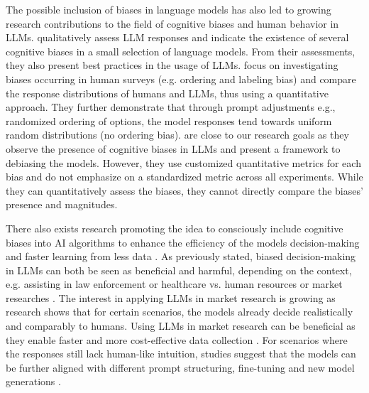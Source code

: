 \par The possible inclusion of biases in language models has also led to growing research contributions to the field of cognitive biases and human behavior in LLMs. \textcite{talboy2023challenging} qualitatively assess LLM responses and indicate the existence of several cognitive biases in a small selection of language models. From their assessments, they also present best practices in the usage of LLMs. \textcite{dominguez2023questioning} focus on investigating biases occurring in human surveys (e.g. ordering and labeling bias) and compare the response distributions of humans and LLMs, thus using a quantitative approach. They further demonstrate that through prompt adjustments e.g., randomized ordering of options, the model responses tend towards uniform random distributions (no ordering bias). \textcite{echterhoff2024cognitive} are close to our research goals as they observe the presence of cognitive biases in LLMs and present a framework to debiasing the models. However, they use customized quantitative metrics for each bias and do not emphasize on a standardized metric across all experiments. While they can quantitatively assess the biases, they cannot directly compare the biases' presence and magnitudes.

\par There also exists research promoting the idea to consciously include cognitive biases into AI algorithms to enhance the efficiency of the models decision-making and faster learning from less data \parencite{hagendorff2024we, taniguchi2018machine}. As previously stated, biased decision-making in LLMs can both be seen as beneficial and harmful, depending on the context, e.g. assisting in law enforcement or healthcare vs. human resources or market researches \parencite{haltaufderheide2024ethics, zhao2023survey}. The interest in applying LLMs in market research is growing as research shows that for certain scenarios, the models already decide realistically and comparably to humans. Using LLMs in market research can be beneficial as they enable faster and more cost-effective data collection \parencite{brand2023using}. For scenarios where the responses still lack human-like intuition, studies suggest that the models can be further aligned with different prompt structuring, fine-tuning and new model generations \parencite{brand2023using, qiu2023much}.